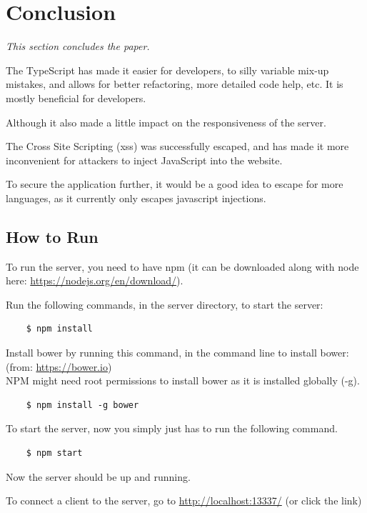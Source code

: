 \documentclass[a4paper]{article}
\begin{document}


\section{Conclusion}
\textit{This section concludes the paper.}

The TypeScript has made it easier for developers, to silly variable mix-up mistakes, and allows for better refactoring, more detailed code help, etc. It is mostly beneficial for developers.

Although it also made a little impact on the responsiveness of the server.

The Cross Site Scripting (xss) was successfully escaped, and has made it more inconvenient for attackers to inject JavaScript into the website.

To secure the application further, it would be a good idea to escape for more languages, as it currently only escapes javascript injections.

\label{page_b4_appendices}




\clearpage
\rfoot{ }



\listoffigures
\listoflistings




\begin{appendices}
\section{How to Run}
\label{app_h2r}
To run the server, you need to have npm (it can be downloaded along with
  node here: \url{https://nodejs.org/en/download/}).

Run the following commands, in the server directory, to start the server:
\begin{verbatim}
	$ npm install
\end{verbatim}
  
Install bower by running this command, in the command line to install
bower: (from: \url{https://bower.io})\\
NPM might need root permissions to install bower as it is installed globally (-g).

\begin{verbatim}
	$ npm install -g bower
\end{verbatim}

To start the server, now you simply just has to run the following command.

\begin{verbatim}
	$ npm start
\end{verbatim}

Now the server should be up and running.

To connect a client to the server, go to \url{http://localhost:13337/} (or click the link)
\end{appendices}
\end{document}
